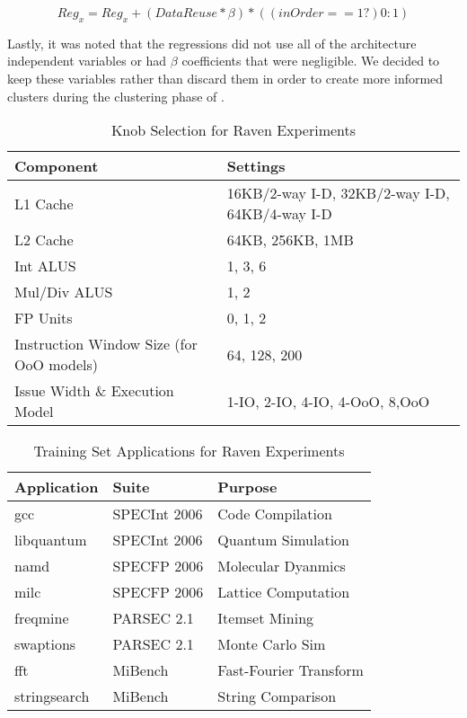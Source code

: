 \begin{equation}
Reg_{x} = Reg_{x} + (DataReuse * \beta) * ((inOrder == 1?) 0 : 1)
\end{equation}


Lastly, it was noted that the regressions did not use all of the architecture
independent variables or had $\beta$ coefficients that were negligible. We decided
to keep these variables rather than discard them in order to create more informed
clusters during the clustering phase of \blackBox{}.

\begin{table}[tl]
   \centering
   \begin{tabular}{|p{1.5in}|p{1.5in}|}
	\hline
	\textbf{Component} & \textbf{Settings}\\
	\hline
	L1 Cache & 16KB/2-way I-D, 32KB/2-way I-D, 64KB/4-way I-D\\
	\hline
	L2 Cache & 64KB, 256KB, 1MB\\
	\hline
        Int ALUS & 1, 3, 6\\
	\hline
	Mul/Div ALUS & 1, 2\\
	\hline
	FP Units & 0, 1, 2\\
	\hline
	Instruction Window Size (for OoO models) & 64, 128, 200\\
	\hline
	Issue Width \& Execution Model & 1-IO, 2-IO, 4-IO, 4-OoO, 8,OoO\\
	\hline
   \end{tabular}
   \caption{Knob Selection for Raven Experiments}
   \label{table:knobs}
\end{table}

\begin{table}[tl]
   \centering
   \begin{tabular}{|p{0.7in}|p{0.8in}|p{1.4in}|}
	\hline
	\textbf{Application} & \textbf{Suite} & \textbf{Purpose}\\
	\hline
	gcc & SPECInt 2006 & Code Compilation\\
	\hline
	libquantum & SPECInt 2006 & Quantum Simulation\\
	\hline
        namd & SPECFP 2006 & Molecular Dyanmics\\
	\hline
	milc & SPECFP 2006 & Lattice Computation\\
	\hline
	freqmine & PARSEC 2.1 & Itemset Mining\\
	\hline
	swaptions & PARSEC 2.1 & Monte Carlo Sim\\
	\hline
	fft & MiBench & Fast-Fourier Transform\\
	\hline
	stringsearch & MiBench & String Comparison\\
	\hline
   \end{tabular}
   \caption{Training Set Applications for Raven Experiments}
   \label{table:trainingset}
\end{table}

